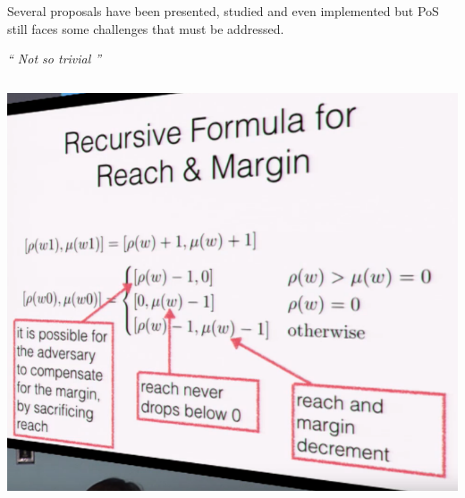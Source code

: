 \documentclass[notitlepage, usenames,dvipsnames]{beamer}
\begin{document}
\begin{frame}
\begin{overlayarea}{\textwidth}{0.85\textheight}
{            \begin{alertblock}{}
                Several proposals have been presented, studied and even implemented but PoS still faces some \alert{challenges} that must be addressed.
            \end{alertblock}

            }

             {
            \vspace{2mm}
            \centering
            {\huge \sl{`` Not so \alert{trivial} ''}}

            \vspace{3ex}
            \begin{columns}[c]
                \includegraphics[scale=0.245]{../img/ouroboros-1.png}


\end{columns}}
\end{overlayarea}
\end{frame}
\end{document}
